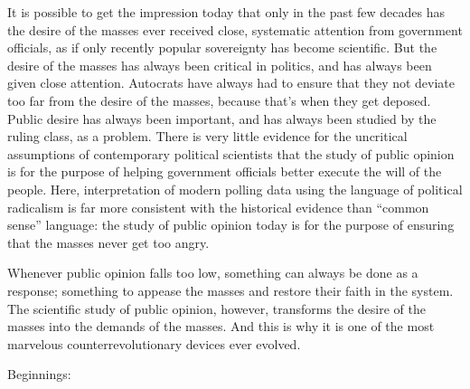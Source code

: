 \documentclass[12pt,book]{article}
\begin{document}
It is possible to get the impression today that only in the past few
decades has the desire of the masses ever received close, systematic
attention from government officials, as if only recently popular
sovereignty has become scientific. But the desire of the masses has
always been critical in politics, and has always been given close
attention. Autocrats have always had to ensure that they not deviate too
far from the desire of the masses, because that's when they get deposed.
Public desire has always been important, and has always been studied by
the ruling class, as a problem. There is very little evidence for the
uncritical assumptions of contemporary political scientists that the
study of public opinion is for the purpose of helping government
officials better execute the will of the people. Here, interpretation of
modern polling data using the language of political radicalism is far
more consistent with the historical evidence than ``common sense''
language: the study of public opinion today is for the purpose of
ensuring that the masses never get too angry.

Whenever public opinion falls too low, something can always be done as a
response; something to appease the masses and restore their faith in the
system. The scientific study of public opinion, however, transforms the
desire of the masses into the demands of the masses. And this is why it
is one of the most marvelous counterrevolutionary devices ever evolved.

Beginnings:
\end{document}
